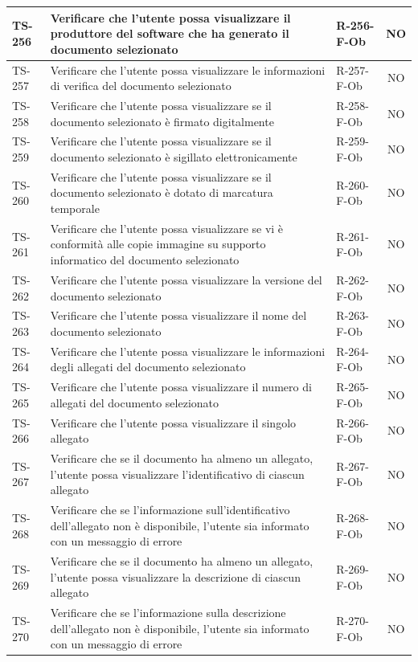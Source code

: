 \documentclass[a4paper,12pt]{article}
\begin{document}
\begin{longtable}{|p{1.5cm}|p{8.3cm}|p{2.4cm}|c|}
\hline
TS-256 & Verificare che l'utente possa visualizzare il produttore del software che ha generato il documento selezionato & R-256-F-Ob & NO \\
\hline
TS-257 & Verificare che l'utente possa visualizzare le informazioni di verifica del documento selezionato & R-257-F-Ob & NO \\
\hline
TS-258 & Verificare che l'utente possa visualizzare se il documento selezionato è firmato digitalmente & R-258-F-Ob & NO \\
\hline
TS-259 & Verificare che l'utente possa visualizzare se il documento selezionato è sigillato elettronicamente & R-259-F-Ob & NO \\
\hline
TS-260 & Verificare che l'utente possa visualizzare se il documento selezionato è dotato di marcatura temporale & R-260-F-Ob & NO \\
\hline
TS-261 & Verificare che l'utente possa visualizzare se vi è conformità alle copie immagine su supporto informatico del documento selezionato & R-261-F-Ob & NO \\
\hline
TS-262 & Verificare che l'utente possa visualizzare la versione del documento selezionato & R-262-F-Ob & NO \\
\hline
TS-263 & Verificare che l'utente possa visualizzare il nome del documento selezionato & R-263-F-Ob & NO \\
\hline
TS-264 & Verificare che l'utente possa visualizzare le informazioni degli allegati del documento selezionato & R-264-F-Ob & NO \\
\hline
TS-265 & Verificare che l'utente possa visualizzare il numero di allegati del documento selezionato & R-265-F-Ob & NO \\
\hline
TS-266 & Verificare che l'utente possa visualizzare il singolo allegato & R-266-F-Ob & NO \\
\hline
TS-267 & Verificare che se il documento ha almeno un allegato, l'utente possa visualizzare l'identificativo di ciascun allegato & R-267-F-Ob & NO \\
\hline
TS-268 & Verificare che se l'informazione sull'identificativo dell'allegato non è disponibile, l'utente sia informato con un messaggio di errore & R-268-F-Ob & NO \\
\hline
TS-269 & Verificare che se il documento ha almeno un allegato, l'utente possa visualizzare la descrizione di ciascun allegato & R-269-F-Ob & NO \\
\hline
TS-270 & Verificare che se l'informazione sulla descrizione dell'allegato non è disponibile, l'utente sia informato con un messaggio di errore & R-270-F-Ob & NO \\

\end{longtable}
\end{document}
